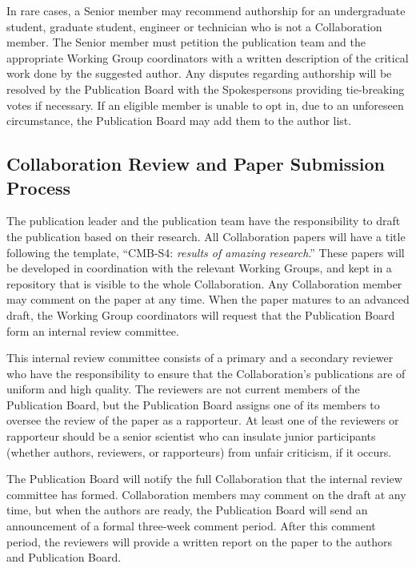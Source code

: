 \documentclass[12pt]{article}
\newcommand\collabname{CMB-S4}
\begin{document}
In rare cases, a Senior member may recommend authorship for an undergraduate student, graduate student, engineer or technician who is not a Collaboration member.  The Senior member must petition the publication team and the appropriate Working Group coordinators with a written description of the critical work done by the suggested author. 
Any disputes regarding authorship will be resolved by the Publication Board with the Spokespersons providing  tie-breaking votes if necessary.  If an eligible member is unable to opt in, due to an unforeseen circumstance, the Publication Board may add them to the author list.

\subsection{Collaboration Review and Paper Submission Process}

The publication leader and the publication team have the responsibility to draft the publication based on their research.  All Collaboration papers will have a title following the template, ``\collabname: \textit{results of amazing research}.''  These papers will be developed in coordination with the relevant Working Groups, and kept in a repository that is visible to the whole Collaboration.  Any Collaboration member may comment on the paper at any time.  When the paper matures to an advanced draft, the Working Group coordinators will request that the Publication Board form an internal review committee.  

This internal review committee consists of a primary and a secondary reviewer who have the responsibility to ensure that the Collaboration's publications are of uniform and high quality.  The reviewers are not current members of the Publication Board, but the Publication Board assigns one of its members to oversee the review of the paper as a rapporteur.  At least one of the reviewers or rapporteur should be a senior scientist who can insulate junior participants (whether authors, reviewers, or rapporteurs) from unfair criticism, if it occurs.

The Publication Board will notify the full Collaboration that the internal review committee has formed.  Collaboration members may comment on the draft at any time, but when the authors are ready, the Publication Board will send an announcement of a formal three-week comment period. After this comment period, the reviewers will provide a written report on the paper to the authors and Publication Board.
\end{document}
